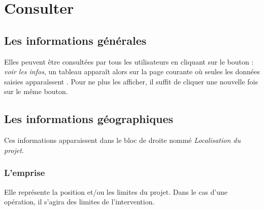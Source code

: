 \documentclass[letterpaper,10pt,french]{sphinxmanual}
\begin{document}
\section{Consulter}
\label{manuel/formulaire_projet:consulter}\begin{figure}[htbp]
\centering

\end{figure}


\subsection{Les informations générales}
\label{manuel/formulaire_projet:les-informations-generales}
Elles peuvent être consultées par tous les utilisateurs en cliquant sur le bouton : \emph{voir les infos}, un tableau apparaît alors sur la page courante où seules les données saisies apparaîssent . Pour ne plus les afficher, il suffit de cliquer une nouvelle fois sur le même bouton.


\subsection{Les informations géographiques}
\label{manuel/formulaire_projet:les-informations-geographiques}
Ces informations apparaissent dans le bloc de droite nommé \emph{Localisation du projet}.


\subsubsection{L'emprise}
\label{manuel/formulaire_projet:l-emprise}
Elle représente la position et/ou les limites du projet. Dans le cas d'une opération, il s'agira des limites de l'intervention.
\end{document}
